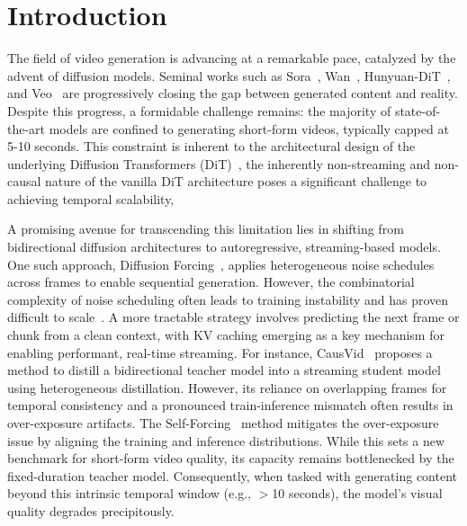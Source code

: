 \section{Introduction}
The field of video generation is advancing at a remarkable pace, catalyzed by the advent of diffusion models. Seminal works such as Sora~\citep{openai2024sora}, Wan~\citep{wan2025}, Hunyuan-DiT~\citep{kong2024hunyuanvideo}, and Veo~\citep{deepmind_veo} are progressively closing the gap between generated content and reality. Despite this progress, a formidable challenge remains: the majority of state-of-the-art models are confined to generating short-form videos, typically capped at 5-10 seconds. This constraint is inherent to the architectural design of the underlying Diffusion Transformers (DiT)~\citep{peebles2023scalable}, the inherently non-streaming and non-causal nature of the vanilla DiT architecture poses a significant challenge to achieving temporal scalability,

A promising avenue for transcending this limitation lies in shifting from bidirectional diffusion architectures to autoregressive, streaming-based models. One such approach, Diffusion Forcing~\citep{chen2024diffusion, kim2024fifo}, applies heterogeneous noise schedules across frames to enable sequential generation. However, the combinatorial complexity of noise scheduling often leads to training instability and has proven difficult to scale~\cite{chen2025skyreels,he2025matrix}.
A more tractable strategy involves predicting the next frame or chunk from a clean context, with KV caching emerging as a key mechanism for enabling performant, real-time streaming. For instance, CausVid~\citep{yin2025causvid} proposes a method to distill a bidirectional teacher model into a streaming student model using heterogeneous distillation. However, its reliance on overlapping frames for temporal consistency and a pronounced train-inference mismatch often results in over-exposure artifacts. The Self-Forcing~\citep{huang2025self} method mitigates the over-exposure issue by aligning the training and inference distributions. While this sets a new benchmark for short-form video quality, its capacity remains bottlenecked by the fixed-duration teacher model. Consequently, when tasked with generating content beyond this intrinsic temporal window (e.g., $>$10 seconds), the model's visual quality degrades precipitously. 


